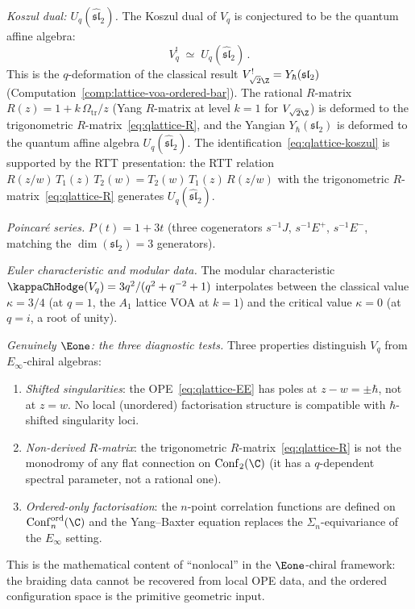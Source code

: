 \begin{conjecture}
\smallskip
\noindent
\emph{Koszul dual: $U_q(\widehat{\mathfrak{sl}}_2)$.}
The Koszul dual of $V_q$ is conjectured to be the
quantum affine algebra:
\begin{equation}\label{eq:qlattice-koszul}
V_q^!
\;\simeq\;
U_q(\widehat{\mathfrak{sl}}_2)\,.
\end{equation}
This is the $q$-deformation of the classical result
$V_{\sqrt{2}\Z}^! = Y_\hbar(\mathfrak{sl}_2)$
(Computation~\ref{comp:lattice-voa-ordered-bar}).
The rational $R$-matrix $R(z) = 1 + k\,\Omega_{\mathrm{tr}}/z$
(Yang $R$-matrix at level $k=1$ for $V_{\sqrt{2}\Z}$)
is deformed to the trigonometric
$R$-matrix~\eqref{eq:qlattice-R}, and the Yangian
$Y_\hbar(\mathfrak{sl}_2)$ is deformed to the quantum
affine algebra $U_q(\widehat{\mathfrak{sl}}_2)$.
The identification~\eqref{eq:qlattice-koszul} is
supported by the RTT presentation: the RTT relation
$R(z/w)\,T_1(z)\,T_2(w) = T_2(w)\,T_1(z)\,R(z/w)$
with the trigonometric $R$-matrix~\eqref{eq:qlattice-R}
generates $U_q(\widehat{\mathfrak{sl}}_2)$.

\smallskip
\noindent
\emph{Poincar\'{e} series.}
$P(t) = 1 + 3t$ (three cogenerators $s^{-1}J$,
$s^{-1}E^+$, $s^{-1}E^-$, matching the
$\dim(\mathfrak{sl}_2) = 3$ generators).

\smallskip
\noindent
\emph{Euler characteristic and modular data.}
The modular characteristic $\kappaChHodge(V_q) = 3q^2/(q^2 + q^{-2} + 1)$
interpolates between the classical value $\kappa = 3/4$
(at $q = 1$, the $A_1$ lattice VOA at $k = 1$) and the
critical value $\kappa = 0$ (at $q = i$, a root of unity).

\smallskip
\noindent
\emph{Genuinely $\Eone$: the three diagnostic tests.}
Three properties distinguish $V_q$ from
$E_\infty$-chiral algebras:
\begin{enumerate}[label=\textup{(\roman*)},nosep]
\item \emph{Shifted singularities}: the OPE~\eqref{eq:qlattice-EE}
 has poles at $z - w = \pm\hbar$, not at $z = w$. No local
 (unordered) factorisation structure is compatible with
 $\hbar$-shifted singularity loci.
\item \emph{Non-derived $R$-matrix}: the trigonometric
 $R$-matrix~\eqref{eq:qlattice-R} is not the monodromy
 of any flat connection on $\Conf_2(\C)$ (it has a
 $q$-dependent spectral parameter, not a rational one).
\item \emph{Ordered-only factorisation}: the $n$-point
 correlation functions are defined on
 $\Conf_n^{\mathrm{ord}}(\C)$ and the Yang--Baxter
 equation replaces the $\Sigma_n$-equivariance of
 the $E_\infty$ setting.
\end{enumerate}
This is the mathematical content of ``nonlocal'' in the
$\Eone$-chiral framework: the braiding data cannot be
recovered from local OPE data, and the ordered configuration
space is the primitive geometric input.


\end{conjecture}
